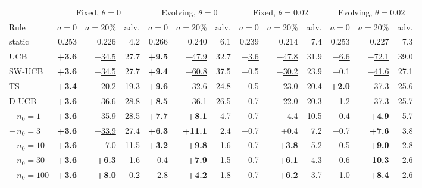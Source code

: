 \begin{tabular}{lrrrrrrrrrrrr}
\toprule
 & \multicolumn{3}{c}{Fixed, $\theta=0$} & \multicolumn{3}{c}{Evolving, $\theta=0$} & \multicolumn{3}{c}{Fixed, $\theta=0.02$} & \multicolumn{3}{c}{Evolving, $\theta=0.02$}\\
\cmidrule(lr){2-4}\cmidrule(lr){5-7}\cmidrule(lr){8-10}\cmidrule(lr){11-13}
Rule & $a{=}0$ & $a{=}20\%$ & adv. & $a{=}0$ & $a{=}20\%$ & adv. & $a{=}0$ & $a{=}20\%$ & adv. & $a{=}0$ & $a{=}20\%$ & adv.\\
\midrule
static & 0.253 & 0.226 & 4.2 & 0.266 & 0.240 & 6.1 & 0.239 & 0.214 & 7.4 & 0.253 & 0.227 & 7.3\\
\midrule
UCB & \textbf{+3.6} & \underline{$-$34.5} & 27.7 & \textbf{+9.5} & \underline{$-$47.9} & 32.7 & \underline{$-$3.6} & \underline{$-$47.8} & 31.9 & \underline{$-$6.6} & \underline{$-$72.1} & 39.0\\
SW-UCB & \textbf{+3.6} & \underline{$-$34.5} & 27.7 & \textbf{+9.4} & \underline{$-$60.8} & 37.5 & $-$0.5 & \underline{$-$30.2} & 23.9 & +0.1 & \underline{$-$41.6} & 27.1\\
TS & \textbf{+3.4} & \underline{$-$20.2} & 19.3 & \textbf{+9.6} & \underline{$-$32.6} & 24.8 & +0.5 & \underline{$-$23.0} & 20.4 & \textbf{+2.0} & \underline{$-$37.3} & 25.6\\
D-UCB & \textbf{+3.6} & \underline{$-$36.6} & 28.8 & \textbf{+8.5} & \underline{$-$36.1} & 26.5 & +0.7 & \underline{$-$22.0} & 20.3 & +1.2 & \underline{$-$37.3} & 25.7\\
\quad $+\,n_0{=}1$ & \textbf{+3.6} & \underline{$-$35.9} & 28.5 & \textbf{+7.7} & \textbf{+8.1} & 4.7 & +0.7 & \underline{$-$4.4} & 10.5 & +0.4 & \textbf{+4.9} & 5.7\\
\quad $+\,n_0{=}3$ & \textbf{+3.6} & \underline{$-$33.9} & 27.4 & \textbf{+6.3} & \textbf{+11.1} & 2.4 & +0.7 & +0.4 & 7.2 & +0.7 & \textbf{+7.6} & 3.8\\
\quad $+\,n_0{=}10$ & \textbf{+3.6} & \underline{$-$7.0} & 11.5 & \textbf{+3.2} & \textbf{+9.8} & 1.6 & +0.7 & \textbf{+3.8} & 5.2 & $-$0.5 & \textbf{+9.0} & 2.8\\
\quad $+\,n_0{=}30$ & \textbf{+3.6} & \textbf{+6.3} & 1.6 & $-$0.4 & \textbf{+7.9} & 1.5 & +0.7 & \textbf{+6.1} & 4.3 & $-$0.6 & \textbf{+10.3} & 2.6\\
\quad $+\,n_0{=}100$ & \textbf{+3.6} & \textbf{+8.0} & 0.2 & $-$2.8 & \textbf{+4.2} & 1.8 & +0.7 & \textbf{+6.2} & 3.7 & $-$1.0 & \textbf{+8.4} & 2.6\\
\bottomrule
\end{tabular}

